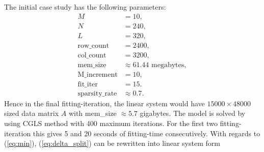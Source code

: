 \documentclass[12pt]{article}
\begin{document}
The initial case study has the following parameters:
\begin{equation*}
	\begin{split}
		M &= 10,\\
		N &= 240,\\
		L &= 320, \\
		\text{row\_count} &= 2400,\\
		\text{col\_count} &= 3200, \\
		\text{mem\_size} &\approx 61.44 \text{ megabytes}, \\
		\text{M\_increment} &= 10, \\
		\text{fit\_iter} &= 15. \\
		\text{sparsity\_rate} &\approx 0.7.
	\end{split}
\end{equation*}
Hence in the final fitting-iteration, the linear system would have $15000 \times 48000$ sized data matrix $A$ with mem\_size $\approx 5.7$ gigabytes. The model is solved by using CGLS method with 400 maximum iterations. For the first two fitting-iteration this gives 5 and 20 seconds of fitting-time consecutively. 
\iffalse
With regards to (\ref{eq:min}), (\ref{eq:delta_split}) can be rewritten into linear system form
\end{document}
